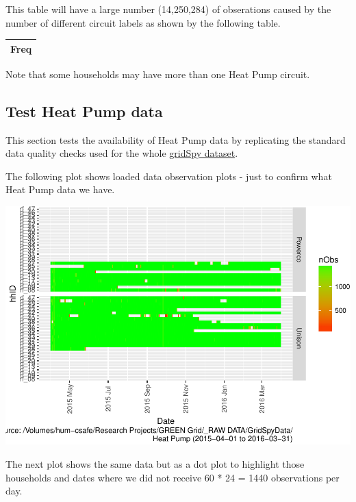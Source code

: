 \documentclass[]{article}
\begin{document}
This table will have a large number (14,250,284) of obserations caused
by the number of different circuit labels as shown by the following
table.

\begin{longtable}[]{@{}r@{}}
\toprule
Freq\tabularnewline
\midrule
\endhead
\bottomrule
\end{longtable}

Note that some households may have more than one Heat Pump circuit.

\subsection{Test Heat Pump data}\label{test-heat-pump-data}

This section tests the availability of Heat Pump data by replicating the
standard data quality checks used for the whole
\href{https://git.soton.ac.uk/ba1e12/nzGREENGrid/tree/master/dataProcessing/gridSpy}{gridSpy
dataset}.

The following plot shows loaded data observation plots - just to confirm
what Heat Pump data we have.

\includegraphics{nzGGHouseholdPowerDemandProfile_Heat Pump_2015-04-01_2016-03-31_files/figure-latex/loadedFilesObs Tile Plot-1.pdf}

The next plot shows the same data but as a dot plot to highlight those
households and dates where we did not receive 60 * 24 = 1440
observations per day.
\end{document}
